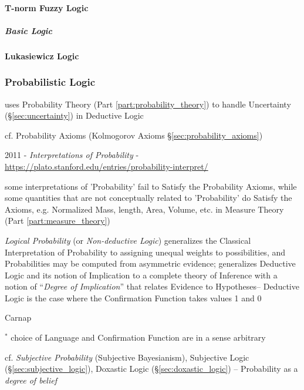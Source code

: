 \paragraph{T-norm Fuzzy Logic}\label{sec:tnorm_logic}\hfill

\subparagraph{Basic Logic}\label{sec:basic_logic}\hfill



\paragraph{Lukasiewicz Logic}\label{sec:lukasiewicz_logic}\hfill



\subsubsection{Probabilistic Logic}\label{sec:probabilistic_logic}

uses Probability Theory (Part \ref{part:probability_theory}) to handle
Uncertainty (\S\ref{sec:uncertainty}) in Deductive Logic

cf. Probability Axioms (Kolmogorov Axioms \S\ref{sec:probability_axioms})

2011 - \emph{Interpretations of Probability} -
\url{https://plato.stanford.edu/entries/probability-interpret/}

some interpretations of 'Probability' fail to Satisfy the Probability Axioms,
while some quantities that are not conceptually related to 'Probability' do
Satisfy the Axioms, e.g. Normalized Mass, length, Area, Volume, etc. in Measure
Theory (Part \ref{part:measure_theory})

\emph{Logical Probability} (or \emph{Non-deductive Logic}) generalizes the
Classical Interpretation of Probability to assigning unequal weights to
possibilities, and Probabilities may be computed from asymmetric evidence;
generalizes Deductive Logic and its notion of Implication to a complete theory
of Inference with a notion of ``\emph{Degree of Implication}'' that relates
Evidence to Hypotheses-- Deductive Logic is the case where the Confirmation
Function takes values 1 and 0

Carnap

$^*$ choice of Language and Confirmation Function are in a sense arbitrary

cf. \emph{Subjective Probability} (Subjective Bayesianism), Subjective Logic
(\S\ref{sec:subjective_logic}), Doxastic Logic (\S\ref{sec:doxastic_logic}) --
Probability as a \emph{degree of belief}

